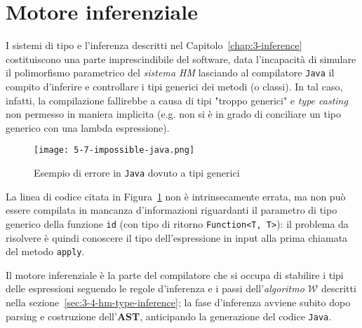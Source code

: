 \section{Motore inferenziale}
\label{sec:5-7-inference-engine}

I sistemi di tipo e l'inferenza descritti nel Capitolo~\ref{chap:3-inference} costituiscono una parte imprescindibile del software,
data l'incapacità di simulare il polimorfismo parametrico del \textit{sistema HM} lasciando al compilatore \texttt{Java}
il compito d'inferire e controllare i tipi generici dei metodi (o classi).
In tal caso, infatti, la compilazione fallirebbe a causa di tipi "troppo generici" e \textit{type casting} non permesso
in maniera implicita (e.g. non si è in grado di conciliare un tipo generico con una lambda espressione).

\begin{figure}
    \vspace{4mm}
    \texttt{[image: 5-7-impossible-java.png]}
    \caption{Esempio di errore in \texttt{Java} dovuto a tipi generici}
    \label{fig:5-7-impossible-java}
    \vspace{4mm}
\end{figure}

\noindent La linea di codice citata in Figura~\ref{fig:5-7-impossible-java} non è intrinsecamente errata,
ma non può essere compilata in mancanza d'informazioni riguardanti il parametro di tipo generico della funzione \texttt{id}
(con tipo di ritorno \texttt{Function<T, T>}): il problema da risolvere è quindi conoscere il tipo dell'espressione
in input alla prima chiamata del metodo \texttt{apply}.


Il motore inferenziale è la parte del compilatore che si occupa di stabilire i tipi delle espressioni seguendo le regole
d'inferenza e i passi dell'\textit{algoritmo $\mathcal{W}$} \cite{Grabmuller-2006-AlgorithmW}
descritti nella sezione~\ref{sec:3-4-hm-type-inference}; la fase d'inferenza avviene subito dopo parsing
e costruzione dell'\textbf{AST}, anticipando la generazione del codice \texttt{Java}.



\newpage

